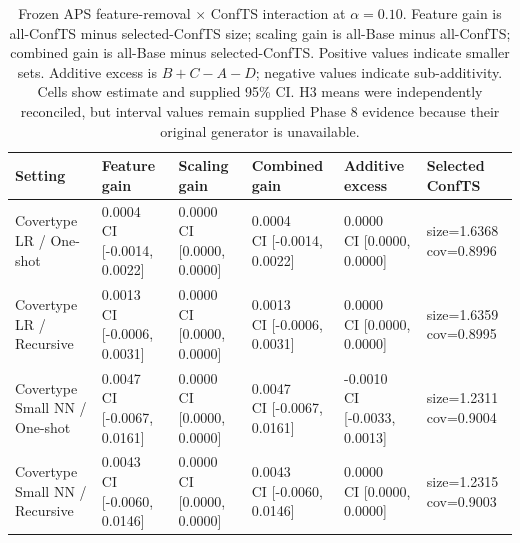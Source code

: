 \begin{table}[t]
\centering
\caption{Frozen APS feature-removal $\times$ ConfTS interaction at $\alpha=0.10$. Feature gain is all-ConfTS minus selected-ConfTS size; scaling gain is all-Base minus all-ConfTS; combined gain is all-Base minus selected-ConfTS. Positive values indicate smaller sets. Additive excess is $B+C-A-D$; negative values indicate sub-additivity. Cells show estimate and supplied 95\% CI. H3 means were independently reconciled, but interval values remain supplied Phase 8 evidence because their original generator is unavailable.}
\label{tab:t4-scaling-compact}
\scriptsize
\begin{tabular}{llllll}
\hline
Setting & Feature gain & Scaling gain & Combined gain & Additive excess & Selected ConfTS \\
\hline
\shortstack{Covertype\\LR / One-shot} & \shortstack{0.0004\\CI [-0.0014, 0.0022]} & \shortstack{0.0000\\CI [0.0000, 0.0000]} & \shortstack{0.0004\\CI [-0.0014, 0.0022]} & \shortstack{0.0000\\CI [0.0000, 0.0000]} & \shortstack{size=1.6368\\cov=0.8996} \\
\shortstack{Covertype\\LR / Recursive} & \shortstack{0.0013\\CI [-0.0006, 0.0031]} & \shortstack{0.0000\\CI [0.0000, 0.0000]} & \shortstack{0.0013\\CI [-0.0006, 0.0031]} & \shortstack{0.0000\\CI [0.0000, 0.0000]} & \shortstack{size=1.6359\\cov=0.8995} \\
\shortstack{Covertype\\Small NN / One-shot} & \shortstack{0.0047\\CI [-0.0067, 0.0161]} & \shortstack{0.0000\\CI [0.0000, 0.0000]} & \shortstack{0.0047\\CI [-0.0067, 0.0161]} & \shortstack{-0.0010\\CI [-0.0033, 0.0013]} & \shortstack{size=1.2311\\cov=0.9004} \\
\shortstack{Covertype\\Small NN / Recursive} & \shortstack{0.0043\\CI [-0.0060, 0.0146]} & \shortstack{0.0000\\CI [0.0000, 0.0000]} & \shortstack{0.0043\\CI [-0.0060, 0.0146]} & \shortstack{0.0000\\CI [0.0000, 0.0000]} & \shortstack{size=1.2315\\cov=0.9003} \\

\end{tabular}
\end{table}
